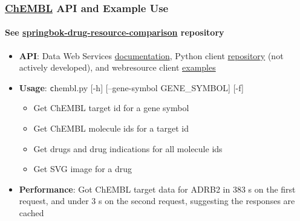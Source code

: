 \documentclass[aspectratio=169,xcolor=dvipsnames]{beamer}
\begin{document}
\begin{frame}
  \frametitle{\href{https://www.ebi.ac.uk/chembl/}{ChEMBL} API and
    Example Use}
  \framesubtitle{See
    \href{https://github.com/ralatsdc/springbok-drug-resource-comparison}{springbok-drug-resource-comparison}
    repository}
  \begin{itemize}
  \item[] \textbf{API}: Data Web Services
    \href{https://chembl.gitbook.io/chembl-interface-documentation/web-services/chembl-data-web-services}{documentation},
    Python client
    \href{https://github.com/chembl/chembl_webresource_client}{repository}
    (not actively developed), and webresource client
    \href{http://beta.mybinder.org/v2/gh/chembl/chembl_webresource_client/master?filepath=demo_wrc.ipynb}{examples}
    \vspace{0.5\baselineskip}
  \item[] \textbf{Usage}: {\texttt chembl.py [-h] [--gene-symbol GENE\_SYMBOL]
    [-f]}
    \begin{itemize}
    \item Get ChEMBL target id for a gene symbol
    \item Get ChEMBL molecule ids for a target id
    \item Get drugs and drug indications for all molecule ids
    \item Get SVG image for a drug
    \end{itemize}
    \vspace{0.5\baselineskip}
  \item[] \textbf{Performance}: Got ChEMBL target data for ADRB2 in 383 s on
    the first request, and under 3 s on the second request, suggesting
    the responses are cached
  \end{itemize}
\end{frame}
\end{document}
